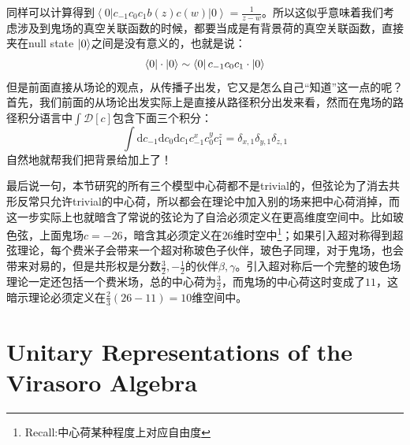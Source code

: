 同样可以计算得到$\left<0\right|c_{-1}c_0c_1b(z)c(w)\left|0\right>=\frac1{z-w}$。所以这似乎意味着我们考虑涉及到鬼场的真空关联函数的时候，都要当成是有背景荷的真空关联函数，直接夹在null state $\ket{0}$之间是没有意义的，也就是说：
\begin{equation}
	\bra{0}\cdot\ket{0}\sim\bra{0}c_{-1}c_0c_1\cdot\ket{0}
\end{equation}
但是前面直接从场论的观点，从传播子出发，它又是怎么自己“知道”这一点的呢？首先，我们前面的从场论出发实际上是直接从路径积分出发来看，然而在鬼场的路径积分语言中$\int\mathcal{D}[c]$包含下面三个积分：
\begin{equation}
	\int\mathrm{d}c_{-1}\mathrm{d}c_0\mathrm{d}c_1c_{-1}^xc_0^yc_1^z=\delta_{x,1}\delta_{y,1}\delta_{z,1}
\end{equation}
自然地就帮我们把背景给加上了！
\begin{remark}
	最后说一句，本节研究的所有三个模型中心荷都不是trivial的，但弦论为了消去共形反常只允许trivial的中心荷，所以都会在理论中加入别的场来把中心荷消掉，而这一步实际上也就暗含了常说的弦论为了自洽必须定义在更高维度空间中。比如玻色弦，上面鬼场$c=-26$，暗含其必须定义在$26$维时空中\footnote{Recall:中心荷某种程度上对应自由度}；如果引入超对称得到超弦理论，每个费米子会带来一个超对称玻色子伙伴，玻色子同理，对于鬼场，也会带来对易的，但是共形权是分数$\frac32,-\frac12$的伙伴$\beta,\gamma$。引入超对称后一个完整的玻色场理论一定还包括一个费米场，总的中心荷为$\frac32$，而鬼场的中心荷这时变成了$11$，这暗示理论必须定义在$\frac{2}{3}(26-11)=10$维空间中。
\end{remark}

\section{Unitary Representations of the Virasoro Algebra}
